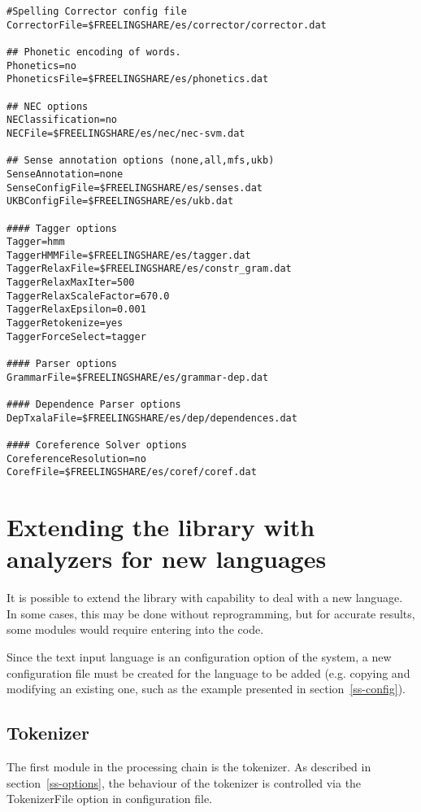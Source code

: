 \documentclass[a4paper]{book}
\begin{document}
{\begin{verbatim}
#Spelling Corrector config file
CorrectorFile=$FREELINGSHARE/es/corrector/corrector.dat

## Phonetic encoding of words.
Phonetics=no
PhoneticsFile=$FREELINGSHARE/es/phonetics.dat

## NEC options
NEClassification=no
NECFile=$FREELINGSHARE/es/nec/nec-svm.dat

## Sense annotation options (none,all,mfs,ukb)
SenseAnnotation=none
SenseConfigFile=$FREELINGSHARE/es/senses.dat
UKBConfigFile=$FREELINGSHARE/es/ukb.dat

#### Tagger options
Tagger=hmm
TaggerHMMFile=$FREELINGSHARE/es/tagger.dat
TaggerRelaxFile=$FREELINGSHARE/es/constr_gram.dat
TaggerRelaxMaxIter=500
TaggerRelaxScaleFactor=670.0
TaggerRelaxEpsilon=0.001
TaggerRetokenize=yes
TaggerForceSelect=tagger

#### Parser options
GrammarFile=$FREELINGSHARE/es/grammar-dep.dat

#### Dependence Parser options
DepTxalaFile=$FREELINGSHARE/es/dep/dependences.dat

#### Coreference Solver options
CoreferenceResolution=no
CorefFile=$FREELINGSHARE/es/coref/coref.dat
\end{verbatim}
}


\chapter{Extending the library with analyzers for new languages}
\label{c-adding-lang}
 
  It is possible to extend the library with capability to deal with a
  new language. In some cases, this may be done without reprogramming,
  but for accurate results, some modules would require entering into
  the code.

  Since the text input language is an configuration option of the
  system, a new configuration file must be created for the language to
  be added (e.g. copying and modifying an existing one, such as the example
  presented in section~\ref{ss-config}). 
 
 \section{Tokenizer}
  The first module in the processing chain is the tokenizer. As
  described in section~\ref{ss-options}, the behaviour of the
  tokenizer is controlled via the TokenizerFile option in
  configuration file. 
\end{document}

